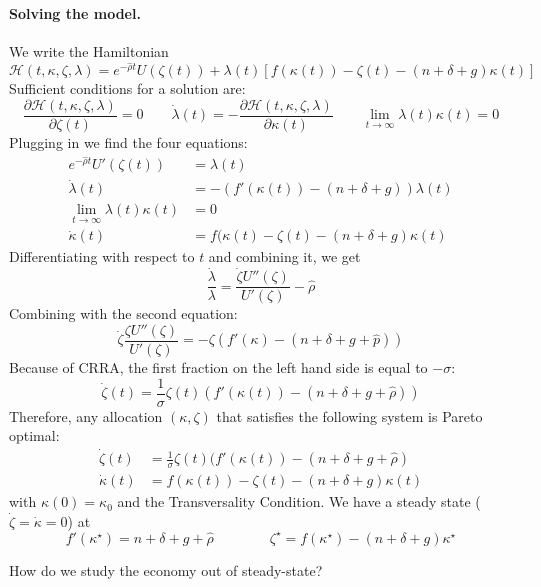 \documentclass[10pt]{article}
\begin{document}
\paragraph{Solving the model.}
	We write the Hamiltonian
	\[
	\mathcal{H}(t,\kappa,\zeta,\lambda) = e^{-\hat{\rho}t} U(\zeta(t)) + \lambda(t)[f(\kappa(t)) - \zeta(t) - (n + \delta + g)\kappa(t)]
	\]
	Sufficient conditions for a solution are:
	\[
	\frac{\partial \mathcal{H}(t,\kappa,\zeta,\lambda)}{\partial \zeta(t)} = 0 \qquad \dot{\lambda}(t) = -\frac{\partial \mathcal{H}(t,\kappa,\zeta,\lambda)}{\partial \kappa(t)} \qquad \lim_{t\to\infty} \lambda(t)\kappa(t) = 0
	\]
	Plugging in we find the four equations:
	\begin{align*}
		e^{-\hat{\rho}t} U'(\zeta(t)) &= \lambda(t) \\
		\dot{\lambda}(t) &= - (f'(\kappa(t)) - (n + \delta + g))\lambda(t) \\
		\lim_{t\to\infty} \lambda(t) \kappa(t) &= 0 \\
		\dot{\kappa}(t) &= f(\kappa(t) - \zeta(t) - (n + \delta + g)\kappa(t)
	\end{align*}
	Differentiating with respect to $t$ and combining it, we get
	\[
	\frac{\dot{\lambda}}{\lambda} = \frac{\dot{\zeta} U''(\zeta)}{U'(\zeta)} - \hat{\rho}
	\]
	Combining with the second equation:
	\[
	\dot{\zeta} \frac{\zeta U''(\zeta)}{U'(\zeta)} = -\zeta ( f'(\kappa) - (n + \delta + g + \hat{p}))
	\]
	Because of CRRA, the first fraction on the left hand side is equal to $-\sigma$:
	\[
	\dot{\zeta}(t) = \frac{1}{\sigma} \zeta(t)(f'(\kappa(t)) - (n + \delta + g + \hat{\rho}))
	\]
	Therefore, any allocation $(\kappa,\zeta)$ that satisfies the following system is Pareto optimal:
	\begin{align*}
		\dot{\zeta}(t) &= \frac{1}{\sigma} \zeta(t) (f'(\kappa(t)) - (n + \delta + g + \hat{\rho}) \\
		\dot{\kappa}(t) &= f(\kappa(t)) - \zeta(t) - (n + \delta + g)\kappa(t)
	\end{align*}
	with $\kappa(0) = \kappa_0$ and the Transversality Condition. We have a steady state ($\dot{\zeta} = \dot{\kappa} = 0$) at
	\[
	f'(\kappa^\star) = n + \delta + g + \hat{\rho} \qquad \qquad \zeta^\star = f(\kappa^\star) - (n + \delta + g)\kappa^\star
	\]


\begin{question}
	How do we study the economy out of steady-state?
\end{question}
\end{document}
